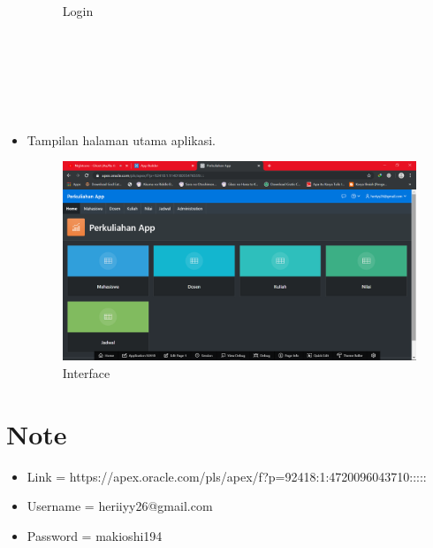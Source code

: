 \documentclass[12pt, times new roman]{article}
\begin{document}
\begin{itemize}
\begin{figure}[htbp]
	\caption{Login}
\end{figure}\\
\\
\\
\\
\\
\item Tampilan halaman utama aplikasi.
\begin{figure}[htbp]
	\centering
	\includegraphics[width=11cm]{figures/Screenshot_21.png}
	\caption{Interface}
\end{figure}
\end{itemize}
\section{Note}
\begin{itemize}
\item Link = https://apex.oracle.com/pls/apex/f?p=92418:1:4720096043710:::::
\item Username = heriiyy26@gmail.com
\item Password = makioshi194
\end{itemize}
\end{document}
